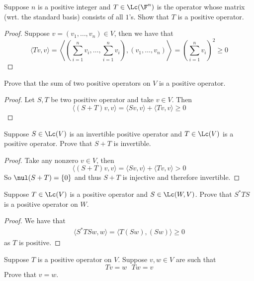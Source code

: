 \documentclass{extarticle}
\begin{document}
\begin{problem}{3}
    Suppose \(n\) is a positive integer and \(T \in \Lc(\F^n)\) is the operator whose matrix (wrt.
    the standard basis) consists of all \(1\)'s. Show that \(T\) is a positive operator.
\end{problem}

\begin{proof}
Suppose \(v = (v_1, \ldots, v_n) \in V\), then we have that
\[\langle Tv,v \rangle
= \left\langle \left(\sum_{i=1}^{n} v_i, \ldots, \sum_{i=1}^{n} v_i \right), (v_1, \ldots, v_n) \right\rangle
= \left(\sum_{i=1}^{n} v_i \right)^2 \geq 0\]
\end{proof}

\begin{problem}{6}
    Prove that the sum of two positive operators on \(V\) is a positive operator.
\end{problem}

\begin{proof}
Let \(S, T\) be two positive operator and take \(v \in V\). Then
\[\langle (S+T)v,v \rangle = \langle Sv,v \rangle + \langle Tv,v \rangle \geq 0\]
\end{proof}

\begin{problem}{7}
    Suppose \(S \in \Lc(V)\) is an invertible positive operator and \(T \in \Lc(V)\) is a positive
    operator. Prove that \(S + T\) is invertible.
\end{problem}

\begin{proof}
Take any nonzero \(v \in V\), then
\[\langle (S+T)v,v \rangle = \langle Sv,v \rangle + \langle Tv,v \rangle > 0\]
So \(\nul (S+T) = \{0\}\) and thus \(S+T\) is injective and therefore invertible.
\end{proof}

\begin{problem}{9}
    Suppose \(T \in \Lc(V)\) is a positive operator and \(S \in \Lc(W, V)\). Prove that
    \(S^* T S\) is a positive operator on \(W\).
\end{problem}

\begin{proof}
We have that
\begin{align*}
    \langle S^*TS w,w \rangle
    = \langle T(Sw), (Sw) \rangle \geq 0
\end{align*}
as \(T\) is positive.
\end{proof}

\begin{problem}{10}
    Suppose \(T\) is a positive operator on \(V\). Suppose \(v, w \in V\) are such that
    \[Tv = w \ \ \ Tw = v\]
    Prove that \(v = w\).
\end{problem}
\end{document}

